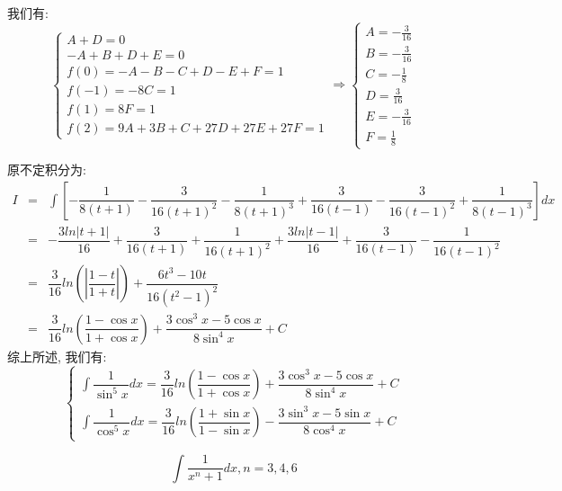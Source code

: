 \begin{corollary}[扩展不定积分]
\begin{solution}
		我们有:  
		$$\left\lbrace
		\begin{array}{l}
			A+D=0\\
			-A+B+D+E=0\\
			f(0)=-A-B-C+D-E+F=1\\
			f(-1)=-8C=1\\
			f(1)=8F=1\\
			f(2)=9A+3B+C+27D+27E+27F=1
		\end{array}
		\right. \Rightarrow \left\lbrace
		\begin{array}{l}
			A=-\frac{3}{16}\\
			B=-\frac{3}{16}\\
			C=-\frac{1}{8}\\
			D=\frac{3}{16}\\
			E=-\frac{3}{16}\\
			F=\frac{1}{8}
		\end{array}
		\right. $$
		
		原不定积分为:  
		\begin{eqnarray*}
			I&=&\int\left[ -\dfrac{1}{8(t+1)}-\dfrac{3}{16(t+1)^2}-\dfrac{1}{8(t+1)^3}+\dfrac{3}{16(t-1)}-\dfrac{3}{16(t-1)^2}+\dfrac{1}{8(t-1)^3}\right]dx\\
			&=&-\dfrac{3ln|t+1|}{16}+\dfrac{3}{16(t+1)}+\dfrac{1}{16(t+1)^2}+\dfrac{3ln|t-1|}{16}+\dfrac{3}{16(t-1)}-\dfrac{1}{16(t-1)^2}\\
			&=&\dfrac{3}{16}ln\left(|\dfrac{1-t}{1+t}| \right)+\dfrac{6t^3-10t}{16(t^2-1)^2}\\
			&=&\dfrac{3}{16}ln\left(\dfrac{1-\cos x}{1+\cos x} \right)+\dfrac{3\cos^3 x-5\cos x}{8\sin^4x}+C
		\end{eqnarray*}
	综上所述, 我们有:
	$$\begin{cases} \int \dfrac{1}{\sin^{5}x}dx = \dfrac{3}{16}ln\left(\dfrac{1-\cos x}{1+\cos x} \right)+\dfrac{3\cos^3 x-5\cos x}{8\sin^4x}+C  \\ 
		\int \dfrac{1}{\cos^{5}x}dx = \dfrac{3}{16}ln\left(\dfrac{1+\sin x}{1 - \sin x} \right) - \dfrac{3\sin^3 x-5\sin x}{8\cos^4x}+C \end{cases}$$
	\end{solution}


	\begin{proposition}
		$$\int \dfrac{1}{x^{n}+1} dx, n = 3,4,6$$
	\end{proposition}

	\begin{solution}


\end{solution}
\end{corollary}
